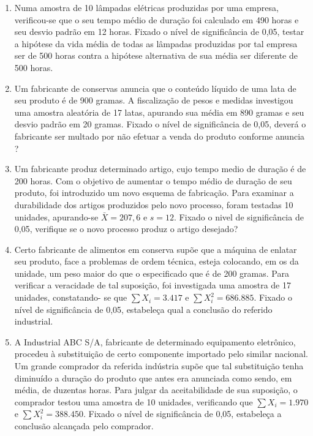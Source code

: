 \begin{enumerate}[resume]
\item Numa amostra de 10 lâmpadas elétricas produzidas por uma empresa, verificou-se que o seu tempo médio de duração foi calculado em 490 horas e seu desvio padrão em 12 horas. Fixado o nível de significância de 0,05, testar a hipótese da vida média de todas as lâmpadas produzidas por tal empresa ser de 500 horas contra a hipótese alternativa de sua média ser diferente de 500 horas.

\item Um fabricante de conservas anuncia que o conteúdo líquido de uma lata de seu produto é de 900 gramas. A fiscalização de pesos e medidas investigou uma amostra aleatória de 17 latas, apurando sua média em 890 gramas e seu desvio padrão em 20 gramas. Fixado o nível de significância de 0,05, deverá o fabricante ser multado por não efetuar a venda do produto conforme anuncia ?

\item Um fabricante produz determinado artigo, cujo tempo medio de duração é de 200 horas. Com o objetivo de aumentar o tempo médio de duração de seu produto, foi introduzido um novo esquema de fabricação. Para examinar a durabilidade dos artigos produzidos pelo novo processo, foram testadas 10 unidades, apurando-se $\bar{X} = 207,6$ e $s = 12$. Fixado o nivel de significância de 0,05, verifique se o novo processo produz o artigo desejado?

\item Certo fabricante de alimentos em conserva supõe que a máquina de enlatar seu produto, face a problemas de ordem técnica, esteja colocando, em os da unidade, um peso maior do que o especificado que é de 200 gramas. Para verificar a veracidade
de tal suposição, foi investigada uma amostra de 17 unidades, constatando- se que $\sum X_{i} = 3.417$ e $\sum X_{i}^{2} = 686. 885$. Fixado o nível de significância de 0,05, estabeleça qual a conclusão do referido industrial.

\item A Industrial ABC S/A, fabricante de determinado equipamento eletrônico, procedeu à substituição de certo componente importado pelo similar nacional. Um grande comprador da referida indústria supõe que tal substituição tenha diminuído a duração do produto que antes era anunciada como sendo, em média, de duzentas horas. Para julgar da aceitabilidade de sua suposição, o comprador testou uma amostra de 10 unidades, verificando que $\sum X_{i} = 1.970$ e $\sum X_{i}^{2} = 388.450$. Fixado o nível de significância de 0,05, estabeleça a conclusão alcançada pelo comprador.


\end{enumerate}
